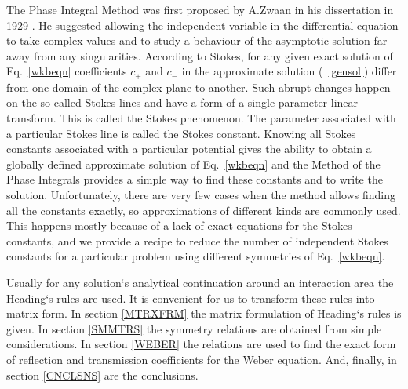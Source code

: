 \documentclass[aps,prl,preprint,superscriptaddress]{revtex4}
\begin{document}
The Phase Integral Method was first proposed by A.Zwaan in his dissertation in 1929 \cite{zwaan}. He suggested allowing the independent variable in the differential equation to take complex values and to study a behaviour of the asymptotic solution far away from any singularities. According to Stokes\cite{stokes}, for any given exact solution of Eq.~\ref{wkbeqn} coefficients $c_+$ and $c_-$ in the approximate solution (~\ref{gensol}) differ from one domain of the complex plane to another. Such abrupt changes happen on the so-called Stokes lines and have a form of a single-parameter linear transform\cite{heading}. This is called the Stokes phenomenon. The parameter associated with a particular Stokes line is called the Stokes constant. Knowing all Stokes constants associated with a particular potential gives the ability to obtain a globally defined approximate solution of Eq.~\ref{wkbeqn}\cite{heading,white} and the Method of the Phase Integrals provides a simple way to find these constants and to write the solution. Unfortunately, there are very few cases when the method allows finding all the constants exactly, so approximations of different kinds \cite{white,ours} are commonly used. This happens mostly because of a lack of exact equations for the Stokes constants, and we provide a recipe to reduce the number of independent Stokes constants for a particular problem using different symmetries of Eq.~\ref{wkbeqn}.

Usually for any solution`s analytical continuation around an interaction area the Heading`s rules \cite{white} are used. It is convenient for us to transform these rules into matrix form. 
In section \ref{MTRXFRM} the matrix formulation of Heading`s rules is given. 
In section \ref{SMMTRS} the symmetry relations are obtained from simple considerations. 
In section \ref{WEBER} the relations are used to find the exact form of reflection and transmission coefficients for the Weber equation. 
And, finally, in section \ref{CNCLSNS} are the conclusions. 
\end{document}
